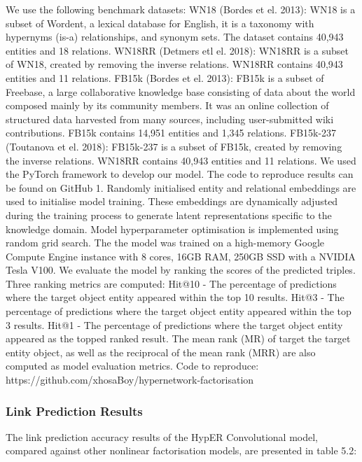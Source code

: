We use the following benchmark datasets: WN18 (Bordes et el. 2013): WN18 is a subset of Wordent, a lexical database for English, it is a taxonomy with hypernyms (is-a) relationships, and synonym sets. The dataset contains 40,943 entities and 18 relations. WN18RR (Detmers etl el. 2018): WN18RR is a subset of WN18, created by removing the inverse relations. WN18RR contains 40,943 entities and 11 relations. \newline 
FB15k (Bordes et el. 2013): FB15k is a subset of Freebase, a large collaborative knowledge base consisting of data about the world composed mainly by its community members. It was an online collection of structured data harvested from many sources, including user-submitted wiki contributions. FB15k contains 14,951 entities and 1,345 relations. FB15k-237 (Toutanova et el. 2018): FB15k-237 is a subset of FB15k, created by removing the inverse relations. WN18RR contains 40,943 entities and 11 relations. \newline
We used the PyTorch framework to develop our model. The code to reproduce results can be found on GitHub 1. Randomly initialised entity and relational embeddings are used to initialise model training. These embeddings are dynamically adjusted during the training process to generate latent representations specific to the knowledge domain. Model hyperparameter optimisation is implemented using random grid search. The the model was trained on a high-memory Google Compute Engine instance with 8 cores, 16GB RAM, 250GB SSD with a NVIDIA Tesla V100. \newline
We evaluate the model by ranking the scores of the predicted triples. Three ranking metrics are computed: Hit@10 - The percentage of predictions where the target object entity appeared within the top 10 results. Hit@3 - The percentage of predictions where the target object entity appeared within the top 3 results. Hit@1 - The percentage of predictions where the target object entity appeared as the topped ranked result. The mean rank (MR) of target the target entity object, as well as the reciprocal of the mean rank (MRR) are also computed as model evaluation metrics. Code to reproduce: https://github.com/xhosaBoy/hypernetwork-factorisation

\subsubsection{Link Prediction Results}
The link prediction accuracy results of the HypER Convolutional model, compared against other nonlinear factorisation models, are presented in table 5.2:

